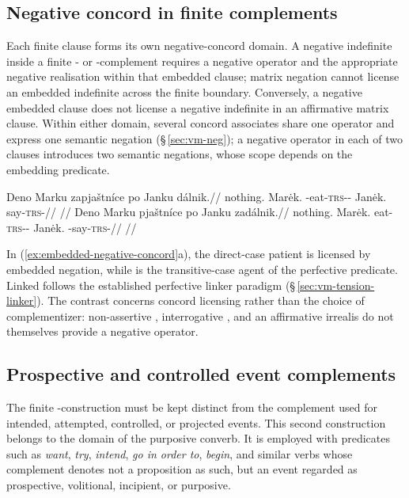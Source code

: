 \subsection{Negative concord in finite complements}
\label{sec:complex-negative-concord}

Each finite clause forms its own negative-concord domain. A negative
indefinite inside a finite - or -complement requires a
negative operator and the appropriate negative realisation within that
embedded clause; matrix negation cannot license an embedded indefinite
across the finite boundary. Conversely, a negative embedded clause does not
license a negative indefinite in an affirmative matrix clause. Within either
domain, several concord associates share one operator and express one
semantic negation (§\,\ref{sec:vm-neg}); a negative operator in each of two
clauses introduces two semantic negations, whose scope depends on the
embedding predicate.

\pex\label{ex:embedded-negative-concord}
\a
\begingl
\gla Deno Marku zapjaštníce po Janku dálnik.//
\glb nothing.\Dir{} Marėk.\Trs{} \Neg{}-eat-\textsc{trs}-\Pf{}-\Lnk{} \Compl{} Janėk.\Trs{} say-\textsc{trs}-\Pf{}//
\glft {}
  //
\endgl
\a
\begingl
\gla *Deno Marku pjaštníce po Janku zadálnik.//
\glb nothing.\Dir{} Marėk.\Trs{} eat-\textsc{trs}-\Pf{}-\Lnk{} \Compl{} Janėk.\Trs{} \Neg{}-say-\textsc{trs}-\Pf{}//
\glft {}
  //
\endgl
\xe

In (\ref{ex:embedded-negative-concord}a), the direct-case patient 
is licensed by embedded negation, while  is the transitive-case
agent of the perfective predicate. Linked  follows the
established perfective linker paradigm (§\,\ref{sec:vm-tension-linker}). The contrast
concerns concord licensing rather than the choice of complementizer:
non-assertive , interrogative , and an affirmative
irrealis do not themselves provide a negative operator.

\subsection{Prospective and controlled event complements}

The finite -construction must be kept distinct from the complement used
for intended, attempted, controlled, or projected events. This second
construction belongs to the domain of the purposive converb. It is employed with
predicates such as \textit{want}, \textit{try}, \textit{intend}, \textit{go in
order to}, \textit{begin}, and similar verbs whose complement denotes not a
proposition as such, but an event regarded as prospective, volitional,
incipient, or purposive.

